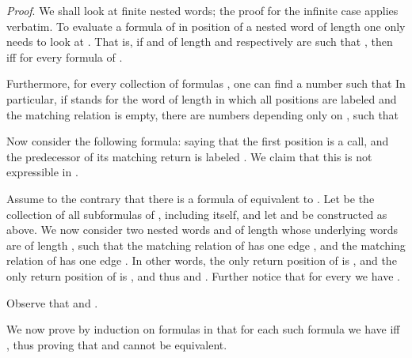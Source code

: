 \documentclass{LMCS}
\theoremstyle{plain}
\theoremstyle{definition}
\begin{document}
{\em Proof}. 
We shall look at finite nested words; the proof for the infinite case
applies verbatim. To evaluate a formula  of  in position
 of a nested word  of length  one only needs to look at
. That is, if  and  of length  and 
respectively are such that , then
 iff  for every formula 
of . 

Furthermore, for every collection of  formulas
, one can find a number 
such that  In particular, if  stands for the word
of length  in which all positions are labeled  and the matching
relation is empty, there are numbers 
depending only on , such that 


Now consider the following  formula:  saying that the first position is
a call, and the predecessor of its matching return is labeled .  We
claim that this is not expressible in .

Assume to the contrary that there is a formula  of 
equivalent to . Let  be the collection of all
subformulas of , including  itself, and let  and
 be constructed as above. We now consider two nested words 
and  of length  whose
underlying words are  of length , such that the matching relation
 of  has one edge , and the matching relation
 of  has one edge . In other words, the only
return position of  is , and  the only
return position of  is , and thus
 and . 
Further notice that for every  we have . 

Observe that  and . 

We now prove by induction on formulas in  that for each such 
formula  we have  iff
, thus proving that  and  cannot
be equivalent. 
\end{document}

